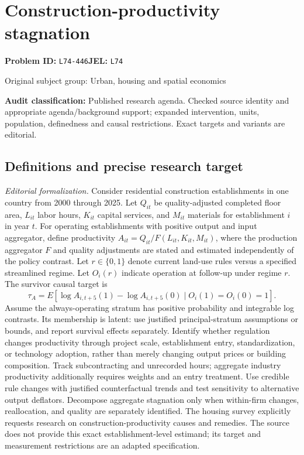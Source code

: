 \documentclass[11pt,a4paper]{article}
\begin{document}
\section*{Construction-productivity stagnation}
\textbf{Problem ID:} \texttt{L74-446}\quad \textbf{JEL:} \texttt{L74}\par
\label{problem:OP-0462}
{\sffamily\small\color{muted}Original subject group: Urban, housing and spatial economics\par}
\label{definitions:problem:30007744}
\textbf{Audit classification:} Published research agenda. Checked source identity and appropriate agenda/background support; expanded intervention, units, population, definedness and causal restrictions. Exact targets and variants are editorial.
\subsection*{Definitions and precise research target}
\textit{Editorial formalization.} Consider residential construction establishments in one country from 2000 through 2025. Let \(Q_{it}\) be quality-adjusted completed floor area, \(L_{it}\) labor hours, \(K_{it}\) capital services, and \(M_{it}\) materials for establishment \(i\) in year \(t\). For operating establishments with positive output and input aggregator, define productivity \(A_{it}=Q_{it}/F(L_{it},K_{it},M_{it})\), where the production aggregator \(F\) and quality adjustments are stated and estimated independently of the policy contrast. Let \(r\in\{0,1\}\) denote current land-use rules versus a specified streamlined regime. Let \(O_i(r)\) indicate operation at follow-up under regime \(r\). The survivor causal target is
\[\tau_A=E[\log A_{i,t+5}(1)-\log A_{i,t+5}(0)\mid O_i(1)=O_i(0)=1].\]
Assume the always-operating stratum has positive probability and integrable log contrasts. Its membership is latent: use justified principal-stratum assumptions or bounds, and report survival effects separately. Identify whether regulation changes productivity through project scale, establishment entry, standardization, or technology adoption, rather than merely changing output prices or building composition. Track subcontracting and unrecorded hours; aggregate industry productivity additionally requires weights and an entry treatment. Use credible rule changes with justified counterfactual trends and test sensitivity to alternative output deflators. Decompose aggregate stagnation only when within-firm changes, reallocation, and quality are separately identified. The housing survey explicitly requests research on construction-productivity causes and remedies. The source does not provide this exact establishment-level estimand; its target and measurement restrictions are an adapted specification.
\end{document}
